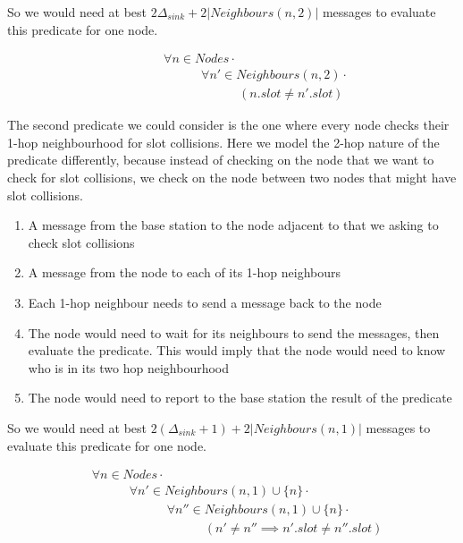 So we would need at best $2\Delta_{sink} + 2|Neighbours(n, 2)|$ messages to evaluate this predicate for one node.

\begin{align}
\label{eq:2-hop-slot-pred}
& \hspace{3em}	\forall n \in Nodes \cdot \\
& \hspace{6em}		\forall n' \in Neighbours(n, 2) \cdot \\
& \hspace{9em}			(n.slot \neq n'.slot)
\end{align}

The second predicate we could consider is the one where every node checks their 1-hop neighbourhood for slot collisions. Here we model the 2-hop nature of the predicate differently, because instead of checking on the node that we want to check for slot collisions, we check on the node between two nodes that might have slot collisions.

\begin{enumerate}
	\item A message from the base station to the node adjacent to that we asking to check slot collisions
	\item A message from the node to each of its 1-hop neighbours
	\item Each 1-hop neighbour needs to send a message back to the node
	\item The node would need to wait for its neighbours to send the messages, then evaluate the predicate. This would imply that the node would need to know who is in its two hop neighbourhood
	\item The node would need to report to the base station the result of the predicate
\end{enumerate}

So we would need at best $2(\Delta_{sink} + 1) + 2|Neighbours(n, 1)|$ messages to evaluate this predicate for one node.

\begin{align}
\label{eq:1-hop-slot-pred}
&				\forall n \in Nodes \cdot \\
& \hspace{3em}		\forall n' \in Neighbours(n, 1) \cup \{n\} \cdot \\
& \hspace{6em}			\forall n'' \in Neighbours(n, 1) \cup \{n\} \cdot \\
& \hspace{9em}				(n' \not= n'' \implies n'.slot \neq n''.slot)
\end{align}

